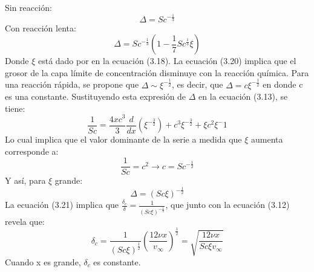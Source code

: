 \documentclass{article}
\begin{document}
Sin reacción:
\begin{equation*}
    \Delta =Sc^{-\frac{1}{3}}
\end{equation*}
Con reacción lenta:
\begin{equation}
    \Delta=Sc^{-\frac{1}{3}}(1-\frac{1}{7}Sc^{\frac{1}{3}}\xi)
\end{equation}
Donde $\xi$ está dado por en la ecuación (3.18). La ecuación (3.20) implica que el grosor de la capa límite de concentración disminuye con la reacción química.
Para una reacción rápida, se propone que $\Delta\sim \xi^{-\frac{1}{2}}$, es decir, que $\Delta=c\xi^{-\frac{1}{2}}$ en donde c es una constante. Sustituyendo esta expresión de $\Delta$ en la ecuación (3.13), se tiene:
\begin{equation*}
    \frac{1}{Sc}=\frac{4xc^3}{3}\frac{d}{dx}(\xi^{-\frac{3}{2}})+c^3\xi^{-\frac{3}{2}}+\xi c^2\xi^-1
\end{equation*}
Lo cual implica que el valor dominante de la serie a medida que $\xi$ aumenta corresponde a:
\begin{equation*}
    \frac{1}{Sc}=c^2\rightarrow c=Sc^{-\frac{1}{2}}
\end{equation*}
Y así, para $\xi$ grande:
\begin{equation}
    \Delta=(Sc\xi)^{-\frac{1}{2}}
\end{equation}
La ecuación (3.21) implica que $\frac{\delta_c}{\delta}=\frac{1}{(Sc\xi)^{-\frac{1}{2}}}$, que junto con la ecuación (3.12) revela que:
\begin{equation*}
    \delta_c=\frac{1}{(Sc\xi)^{\frac{1}{2}}}(\frac{12\nu x}{v_\infty})^{\frac{1}{2}}=\sqrt{\frac{12\nu x}{Sc\xi v_\infty}}
\end{equation*}
Cuando x es grande, $\delta_c$ es constante.
\end{document}
